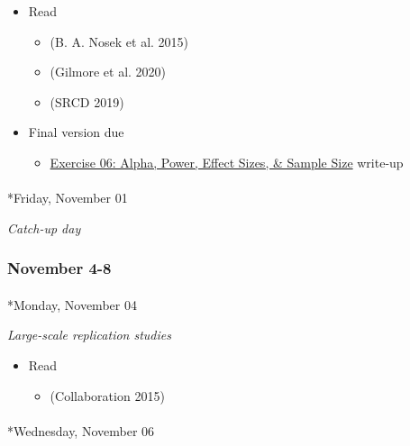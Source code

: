 \documentclass[
  letterpaper,
  DIV=11,
  numbers=noendperiod]{scrartcl}
\makeatletter
\let\oldparagraph\paragraph
\renewcommand{\paragraph}{
    \@ifstar
      \xxxParagraphStar
      \xxxParagraphNoStar
  }
\newcommand{\xxxParagraphStar}[1]{\oldparagraph*{#1}\mbox{}}
\newcommand{\xxxParagraphNoStar}[1]{\oldparagraph{#1}\mbox{}}
\providecommand{\tightlist}{%
  \setlength{\itemsep}{0pt}\setlength{\parskip}{0pt}}\usepackage{longtable,booktabs,array}
\makeatother
\begin{document}
\begin{itemize}
\tightlist
\item
  Read

  \begin{itemize}
  \tightlist
  \item
    (B. A. Nosek et al. 2015)
  \item
    (Gilmore et al. 2020)
  \item
    (SRCD 2019)
  \end{itemize}
\item
  {Final version due}

  \begin{itemize}
  \tightlist
  \item
    \href{exercises/ex06-apes.qmd}{Exercise 06: Alpha, Power, Effect
    Sizes, \& Sample Size} write-up
  \end{itemize}
\end{itemize}

\paragraph*{Friday, November 01}\label{friday-november-01}

\emph{Catch-up day}

\subsubsection*{November 4-8}\label{week-11}

\paragraph*{Monday, November 04}\label{monday-november-04}

\emph{Large-scale replication studies}

\begin{itemize}
\tightlist
\item
  Read

  \begin{itemize}
  \tightlist
  \item
    (Collaboration 2015)
  \end{itemize}
\end{itemize}

\paragraph*{Wednesday, November 06}\label{wednesday-november-06}
\end{document}
